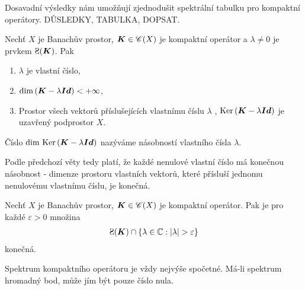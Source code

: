 Dosavadní výsledky nám umožňují zjednodušit spektrální tabulku pro kompaktní operátory. DŮSLEDKY, TABULKA, DOPSAT.

\begin{lemma}
Nechť $X$ je Banachův prostor, $\boldsymbol{K} \in \mathscr{C}(X)$ je kompaktní operátor a $\lambda \neq 0$ je prvkem $\Sp(\map K)$. Pak \begin{enumerate}
    \item $\lambda$ je vlastní číslo,
    \item $\mathrm{dim} \,(\boldsymbol{K} - \lambda \boldsymbol{Id} ) < + \infty$,
    \item Prostor všech vektorů příslušejících vlastnímu číslu $\lambda$ , $\operatorname{Ker}\, (\boldsymbol{K} - \lambda \boldsymbol{Id} )$ je uzavřený podprostor $X$.
\end{enumerate}
\end{lemma}

\begin{definition}
Číslo $\mathrm{dim} \, \operatorname{Ker}\, (\boldsymbol{K} - \lambda \boldsymbol{Id} )$ nazýváme násobností vlastního čísla $\lambda$.
\end{definition}

Podle předchozí věty tedy platí, že každé nenulové vlastní číslo má konečnou násobnost - dimenze prostoru vlastních vektorů, které přísluší jednomu nenulovému vlastnímu číslu, je konečná.

\begin{lemma}
Nechť $X$ je Banachův prostor, $\boldsymbol{K} \in \mathscr{C}(X)$ je kompaktní operátor. Pak je pro každé $\varepsilon>0$ množina \begin{align*}
    \Sp(\map K) \cap \left \lbrace \lambda \in \C : |\lambda| > \varepsilon \right \rbrace
\end{align*}
konečná.
\end{lemma}

\begin{corollary}
Spektrum kompaktního operátoru je vždy nejvýše spočetné. Má-li spektrum hromadný bod, může jím být pouze číslo nula.
\end{corollary}
\pagebreak
